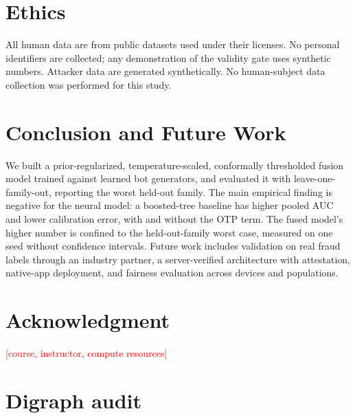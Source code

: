 \documentclass[conference]{IEEEtran}
\newcommand{\TBD}[1]{\textcolor{red}{[#1]}}
\begin{document}
\section{Ethics}
All human data are from public datasets used under their licenses. No personal identifiers are collected; any demonstration of the validity gate uses synthetic numbers. Attacker data are generated synthetically. No human-subject data collection was performed for this study.

\section{Conclusion and Future Work}
We built a prior-regularized, temperature-scaled, conformally thresholded fusion model trained against learned bot generators, and evaluated it with leave-one-family-out, reporting the worst held-out family. The main empirical finding is negative for the neural model: a boosted-tree baseline has higher pooled AUC and lower calibration error, with and without the OTP term. The fused model's higher number is confined to the held-out-family worst case, measured on one seed without confidence intervals. Future work includes validation on real fraud labels through an industry partner, a server-verified architecture with attestation, native-app deployment, and fairness evaluation across devices and populations.

\section*{Acknowledgment}
\TBD{course, instructor, compute resources}

\appendix
\section{Digraph audit}
\label{app:audit}

\end{document}
